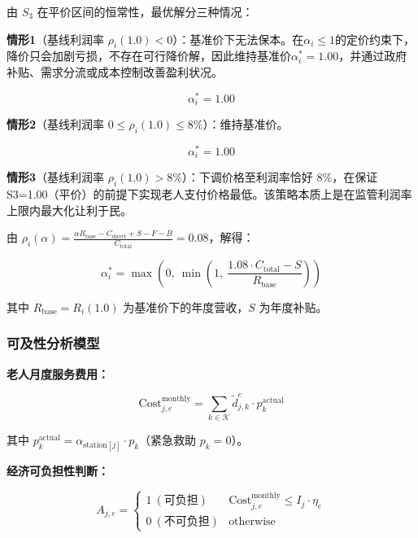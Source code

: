 \documentclass[UTF8]{ctexart}
\begin{document}
由 $S_3$ 在平价区间的恒常性，最优解分三种情况：

\textbf{情形1}（基线利润率 $\rho_i(1.0) < 0$）：基准价下无法保本。在$\alpha_i\leq 1$的定价约束下，降价只会加剧亏损，不存在可行降价解，因此维持基准价$\alpha_i^*=1.00$，并通过政府补贴、需求分流或成本控制改善盈利状况。

\begin{equation}
\alpha_i^* = 1.00 \tag{3.10a}
\end{equation}

\textbf{情形2}（基线利润率 $0 \leq \rho_i(1.0) \leq 8\%$）：维持基准价。

\begin{equation}
\alpha_i^* = 1.00 \tag{3.10b}
\end{equation}

\textbf{情形3}（基线利润率 $\rho_i(1.0) > 8\%$）：下调价格至利润率恰好 8\%，在保证S3=1.00（平价）的前提下实现老人支付价格最低。该策略本质上是在监管利润率上限内最大化让利于民。

由 $\rho_i(\alpha) = \frac{\alpha R_{\text{base}} - C_{\text{direct}} + S - F - B}{C_{\text{total}}} = 0.08$，解得：

\begin{equation}
\alpha_i^* = \max\left(0,\ \min\left(1,\ \frac{1.08 \cdot C_{\text{total}} - S}{R_{\text{base}}}\right)\right) \tag{3.10c}
\end{equation}

其中 $R_{\text{base}} = R_i(1.0)$ 为基准价下的年度营收，$S$ 为年度补贴。

\subsubsection{可及性分析模型}

\textbf{老人月度服务费用：}

\begin{equation}
\text{Cost}_{j,e}^{\text{monthly}} = \sum_{k\in\mathcal{K}} \tilde{d}_{j,k}^{e} \cdot p_k^{\text{actual}} \tag{3.11}
\end{equation}

其中 $p_k^{\text{actual}} = \alpha_{\text{station}[j]} \cdot p_k$（紧急救助 $p_k=0$）。

\textbf{经济可负担性判断：}

\begin{equation}
A_{j,e} = \begin{cases} 1\ (\text{可负担}) & \text{Cost}_{j,e}^{\text{monthly}} \leq I_j \cdot \eta_e \\ 0\ (\text{不可负担}) & \text{otherwise} \end{cases} \tag{3.12}
\end{equation}
\end{document}
